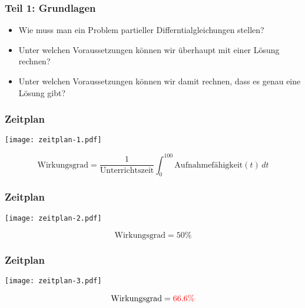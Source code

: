 \begin{frame}
\frametitle{Teil 1: Grundlagen}

\begin{itemize}[<+->]
\item
Wie muss man ein Problem partieller Differntialgleichungen stellen?
\item
Unter welchen Voraussetzungen können wir überhaupt mit einer Lösung 
rechnen?
\item
Unter welchen Voraussetzungen können wir damit rechnen, dass es genau
eine Lösung gibt?
\end{itemize}

\end{frame}

\begin{frame}
\frametitle{Zeitplan}
\begin{center}
\texttt{[image: zeitplan-1.pdf]}
\end{center}
\[
\text{Wirkungsgrad}
=
\frac{1}{\text{Unterrichtszeit}}
\int_0^{100}\text{Aufnahmefähigkeit}(t)\,dt
\]
\end{frame}

\begin{frame}
\frametitle{Zeitplan}
\begin{center}
\texttt{[image: zeitplan-2.pdf]}
\end{center}
\[
\text{Wirkungsgrad}= 50\%
\]
\end{frame}

\begin{frame}
\frametitle{Zeitplan}
\begin{center}
\texttt{[image: zeitplan-3.pdf]}
\end{center}
\[
\text{Wirkungsgrad}= \color{red}66.6\%
\]
\end{frame}

